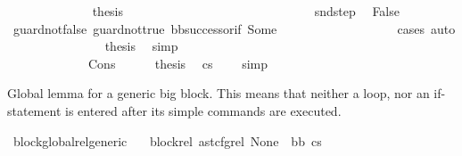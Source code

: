 \begin{isabellebody}
\ \ \ \ \ \ \ \ \ \ \ \ \isamarkupfalse%
\ {\isacharquery}{\kern0pt}thesis\isanewline
\ \ \ \ \ \ \ \ \ \ \ \ \isamarkupfalse%
\ {\isacharminus}{\kern0pt}\isanewline
\ \ \ \ \ \ \ \ \ \ \ \ \ \ \isamarkupfalse%
\ snd{\isacharunderscore}{\kern0pt}step\ \isamarkupfalse%
\ False\ \isamarkupfalse%
\ guard{\isacharunderscore}{\kern0pt}not{\isacharunderscore}{\kern0pt}false{}\ guard{\isacharunderscore}{\kern0pt}not{\isacharunderscore}{\kern0pt}true{}\ bb{\isacharunderscore}{\kern0pt}successor{\isacharunderscore}{\kern0pt}if\ Some\ \isanewline
\ \ \ \ \ \ \ \ \ \ \ \ \ \ \ \ \isamarkupfalse%
\ {\isacharparenleft}{\kern0pt}cases{\isacharparenright}{\kern0pt}\ auto\isanewline
\ \ \ \ \ \ \ \ \ \ \ \ \ \ \isamarkupfalse%
\ {\isacharquery}{\kern0pt}thesis\ \isamarkupfalse%
\ simp\isanewline
\ \ \ \ \ \ \ \ \ \ \ \ \isamarkupfalse%
\isanewline
\ \ \ \ \ \ \ \ \ \ \isamarkupfalse%
\ \ \isanewline
\ \ \ \ \ \ \ \ \isamarkupfalse%
\ \isanewline
\ \ \ \ \ \ \isamarkupfalse%
\isanewline
\ \ \ \ \isamarkupfalse%
\isanewline
\ \ \isamarkupfalse%
\isanewline
\ \ \ \ \isamarkupfalse%
\ Cons\isanewline
\ \ \ \ \isamarkupfalse%
\ {\isacharquery}{\kern0pt}thesis\ \isamarkupfalse%
\ {\isacartoucheopen}cs{}\ {\isacharequal}{\kern0pt}\ {\isacharbrackleft}{\kern0pt}{\isacharbrackright}{\kern0pt}{\isacartoucheclose}\ \isamarkupfalse%
\ simp\isanewline
\ \ \isamarkupfalse%
\isanewline
{}\isamarkupfalse%
%
\endisatagproof
{\isafoldproof}%
%
\isadelimproof
%
\endisadelimproof
%
\begin{isamarkuptext}%
Global lemma for a generic big block. This means that neither a loop, nor an if-statement is entered after its simple commands are executed.%
\end{isamarkuptext}\isamarkuptrue%
\isamarkupfalse%
\ block{\isacharunderscore}{\kern0pt}global{\isacharunderscore}{\kern0pt}rel{\isacharunderscore}{\kern0pt}generic{\isacharcolon}{\kern0pt}\isanewline
\ \ \ block{\isacharunderscore}{\kern0pt}rel{\isacharcolon}{\kern0pt}\ {\isachardoublequoteopen}ast{\isacharunderscore}{\kern0pt}cfg{\isacharunderscore}{\kern0pt}rel\ None\ {\isacharbrackleft}{\kern0pt}{\isacharbrackright}{\kern0pt}\ bb\ cs{}{\isachardoublequoteclose}\isanewline

\end{isabellebody}
